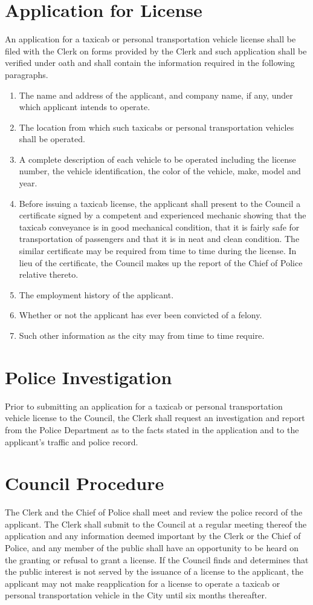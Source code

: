 \section{Application for License}
An application for a taxicab or personal transportation vehicle license shall be filed with the Clerk on forms provided by the Clerk and such application shall be verified under oath and shall contain the information required in the following paragraphs.
\begin{enumerate}[{\indent}A)]
    \item The name and address of the applicant, and company name, if any, under which applicant intends to operate.
    \item The location from which such taxicabs or personal transportation vehicles shall be operated.
    \item A complete description of each vehicle to be operated including the license number, the vehicle identification, the color of the vehicle, make, model and year.
    \item Before issuing a taxicab license, the applicant shall present to the Council a certificate signed by a competent and experienced mechanic showing that the taxicab conveyance is in good mechanical condition, that it is fairly safe for transportation of passengers and that it is in neat and clean condition.  The similar certificate may be required from time to time during the license.  In lieu of the certificate, the Council makes up the report of the Chief of Police relative thereto.
    \item The employment history of the applicant.
    \item Whether or not the applicant has ever been convicted of a felony.
    \item Such other information as the city may from time to time require.
\end{enumerate}

\section{Police Investigation}
Prior to submitting an application for a taxicab or personal transportation vehicle license to the Council, the Clerk shall request an investigation and report from the Police Department as to the facts stated in the application and to the applicant’s traffic and police record.

\section{Council Procedure}
The Clerk and the Chief of Police shall meet and review the police record of the applicant.  The Clerk shall submit to the Council at a regular meeting thereof the application and any information deemed important by the Clerk or the Chief of Police, and any member of the public shall have an opportunity to be heard on the granting or refusal to grant a license.  If the Council finds and determines that the public interest is not served by the issuance of a license to the applicant, the applicant may not make reapplication for a license to operate a taxicab or personal transportation vehicle in the City until six months thereafter.

